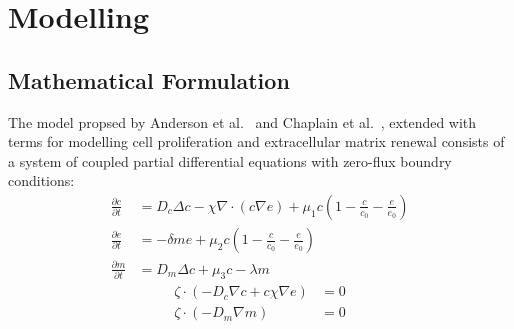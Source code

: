 \section{Modelling}

\subsection{Mathematical Formulation}

The model propsed by Anderson et al.~\cite{anderson_continuous_1998,anderson_mathematical_2000} and Chaplain et al.~\cite{anderson_continuous_1998,chaplain_mathematical_2006-1,franssen_mathematical_2019}, extended with terms for modelling cell proliferation and extracellular matrix renewal consists of a system of coupled partial differential equations with zero-flux boundry conditions: 
\begin{align}
	\frac{\partial c}{\partial t} &= D_c \Delta c - \chi \nabla \cdot (c\nabla e)  + \mu_1 c\left(1-\frac{c}{c_0}-\frac{e}{e_0}\right)\label{eq1}\\
	\frac{\partial e}{\partial t} &= -\delta m e  + \mu_2 c\left(1-\frac{c}{c_0}-\frac{e}{e_0}\right)\label{eq2}\\
	\frac{\partial m}{\partial t} &= D_m \Delta c + \mu_3 c - \lambda m\label{eq3}
\end{align}
\begin{align}
	\zeta \cdot  (-D_c \nabla c + c \chi\nabla e) &= 0 \label{eq4}\\
	\zeta \cdot (-D_m\nabla m ) &= 0\label{eq5}
\end{align}

